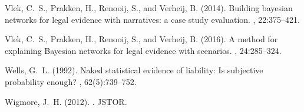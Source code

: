\documentclass[10pt,leqno]{article}
\begin{document}
\begin{thebibliography}{}
Vlek, C.~S., Prakken, H., Renooij, S., and Verheij, B. (2014).
\newblock Building bayesian networks for legal evidence with narratives: a case
  study evaluation.
, 22:375--421.

Vlek, C.~S., Prakken, H., Renooij, S., and Verheij, B. (2016).
\newblock A method for explaining {B}ayesian networks for legal evidence with
  scenarios.
, 24:285--324.

Wells, G.~L. (1992).
\newblock Naked statistical evidence of liability: Is subjective probability
  enough?
, 62(5):739--752.

Wigmore, J.~H. (2012).
.
\newblock JSTOR.

\end{thebibliography}




%
%
\end{document}
